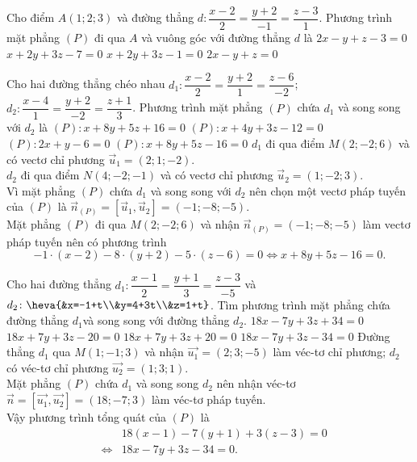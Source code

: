 \begin{ex}
	Cho điểm $A(1;2;3)$ và đường thẳng $d\colon\dfrac{x-2}{2}=\dfrac{y+2}{-1}=\dfrac{z-3}{1}$. Phương trình mặt phẳng $(P)$ đi qua $A$ và vuông góc với đường thẳng $d$ là
	\choice
	{\True $2x-y+z-3=0$}
	{$x+2y+3z-7=0$}
	{$x+2y+3z-1=0$}
	{$2x-y+z=0$}
\end{ex}
\begin{ex}%
	Cho hai đường thẳng chéo nhau  $d_1:\dfrac{x-2}{2}=\dfrac{y+2}{1}=\dfrac{z-6}{-2}$; $d_2:\dfrac{x-4}{1}=\dfrac{y+2}{-2}=\dfrac{z+1}{3}$. Phương trình mặt phẳng $(P)$ chứa $d_1$ và song song với $d_2$ là
	\choice
	{$(P):x+8y+5z+16=0$}
	{$(P):x+4y+3z-12=0$}
	{$(P):2x+y-6=0$}
	{\True $(P):x+8y+5z-16=0$}
	\loigiai
	{
		$d_1$ đi qua điểm $M(2;-2;6)$ và có vectơ chỉ phương $\vec{u}_1=(2;1;-2).$ \\
		$d_2$ đi qua điểm $N(4;-2;-1)$ và có vectơ chỉ phương $\vec{u}_2=(1;-2;3)$.\\
		Vì mặt phẳng $(P)$ chứa $d_1$ và song song với $d_2$ nên chọn một vectơ pháp tuyến của $(P)$ là $ \vec{n}_{(P)}=\left[\vec{u}_1,\vec{u}_2\right]=(-1;-8;-5)$.\\
		Mặt phẳng $(P)$ đi qua $M(2;-2;6)$ và nhận $\vec{n}_{(P)}=(-1;-8;-5)$ làm vectơ pháp tuyến nên có phương trình $$-1\cdot(x-2)-8\cdot(y+2)-5\cdot(z-6)=0  \Leftrightarrow x+8y+5z-16=0.$$
	}
\end{ex}
\begin{ex}%
	Cho hai đường thẳng $ d_1 \colon \dfrac{x-1}{2}=\dfrac{y+1}{3}=\dfrac{z-3}{-5} $ và $ d_2\colon \heva{&x=-1+t\\&y=4+3t\\&z=1+t} $. Tìm phương trình mặt phẳng chứa đường thẳng $ d_1 $và song song với đường thẳng $ d_2. $
	\choice
	{$ 18x-7y+3z+34=0 $}
	{$ 18x+7y+3z-20=0 $}
	{$ 18x+7y+3z+20=0 $}
	{\True $ 18x-7y+3z-34=0 $}
	\loigiai
	{Đường thẳng $ d_1 $ qua $ M(1;-1;3) $ và nhận $ \vec{u_1} =(2;3;-5) $ làm véc-tơ chỉ phương; $ d_2 $ có véc-tơ chỉ phương $ \vec{u_2}=(1;3;1) $.\\
		Mặt phẳng $ (P) $ chứa $ d_1 $ và song song $ d_2 $ nên nhận véc-tơ $ \vec{n} = \left[\vec{u_1},\vec{u_2}\right]=(18;-7;3) $ làm véc-tơ pháp tuyến.\\
		Vậy phương trình tổng quát của $ (P)$ là \begin{eqnarray*}
			&&18(x-1)-7(y+1)+3(z-3)=0\\ &\Leftrightarrow& 18x-7y+3z-34=0.
		\end{eqnarray*}
	}
\end{ex}
